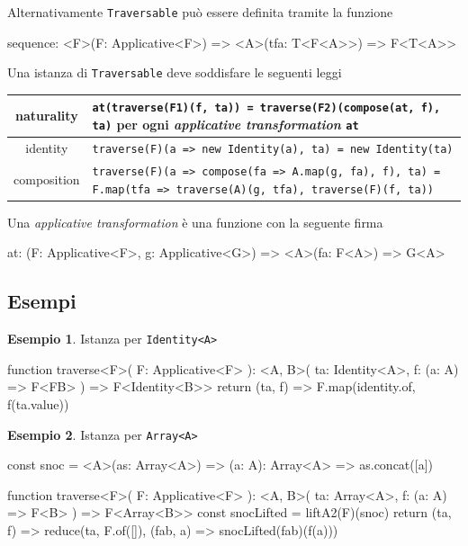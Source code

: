 \documentclass[12pt]{article}
\theoremstyle{definition}
\newtheorem{example}{Esempio}[section]
\newenvironment{code}
  {\vspace{0.5cm} \VerbatimEnvironment\begin{typescriptcode}}
  {\end{typescriptcode} \vspace{0.2cm}}
\begin{document}
Alternativamente \texttt{Traversable} può essere definita tramite la funzione

\begin{code}
sequence: <F>(F: Applicative<F>) => <A>(tfa: T<F<A>>) => F<T<A>>
\end{code}

Una istanza di \texttt{Traversable} deve soddisfare le seguenti leggi

\begin{center}
\bgroup
\def\arraystretch{1.5}
\begin{tabular}{ |c|p{10cm}| }
\hline
naturality & \texttt{at(traverse(F1)(f, ta)) = traverse(F2)(compose(at, f), ta)} per ogni \emph{applicative transformation} \texttt{at} \\
\hline
identity & \texttt{traverse(F)(a => new Identity(a), ta) = new Identity(ta)} \\
\hline
composition & \texttt{traverse(F)(a => compose(fa => A.map(g, fa), f), ta) = F.map(tfa => traverse(A)(g, tfa), traverse(F)(f, ta))} \\
\hline
\end{tabular}
\egroup
\end{center}

Una \emph{applicative transformation} è una funzione con la seguente firma

\begin{code}
at: (F: Applicative<F>, g: Applicative<G>) =>
  <A>(fa: F<A>) => G<A>
\end{code}

\subsection{Esempi}

\begin{example}
Istanza per \texttt{Identity<A>}

\begin{code}
function traverse<F>(
  F: Applicative<F>
): <A, B>(
  ta: Identity<A>,
  f: (a: A) => F<FB>
) => F<Identity<B>> {
  return (ta, f) => F.map(identity.of, f(ta.value))
}
\end{code}
\end{example}

\begin{example}
Istanza per \texttt{Array<A>}

\begin{code}
const snoc = <A>(as: Array<A>) => (a: A): Array<A> =>
  as.concat([a])

function traverse<F>(
  F: Applicative<F>
): <A, B>(
  ta: Array<A>,
  f: (a: A) => F<B>
) => F<Array<B>> {
  const snocLifted = liftA2(F)(snoc)
  return (ta, f) =>
    reduce(ta, F.of([]), (fab, a) => snocLifted(fab)(f(a)))
}
\end{code}
\end{example}
\end{document}
